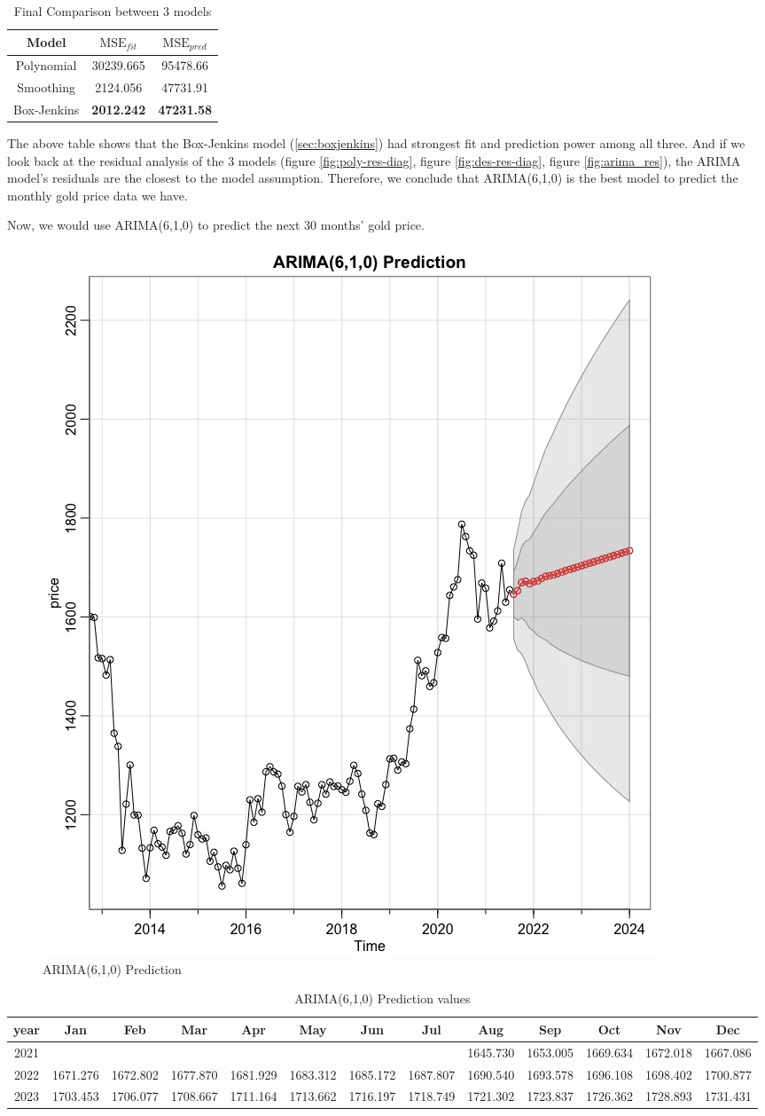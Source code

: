 \documentclass[paper=letter, fontsize=11pt]{scrartcl}
\begin{document}
\begin{table}[H]
    \centering
    \begin{tabular}{|c|c|c|}
    \hline
     Model &  $\mathrm{MSE}_{fit}$ & $\mathrm{MSE}_{pred}$ \\
     \hline\hline
     Polynomial & 30239.665 &  95478.66 \\
    Smoothing &  2124.056&  47731.91 \\
    Box-Jenkins &  \textbf{2012.242}  & \textbf{47231.58} \\
    \hline
    \end{tabular}
    \caption{Final Comparison between 3 models}
\end{table}

The above table shows that the Box-Jenkins model (\ref{sec:boxjenkins}) had strongest fit and prediction power among all three. And if we look back at the residual analysis of the 3 models (figure \ref{fig:poly-res-diag}, figure \ref{fig:des-res-diag}, figure \ref{fig:arima_res}), the ARIMA model's residuals are the closest to the model assumption. Therefore, we conclude that ARIMA(6,1,0) is the best model to predict the monthly gold price data we have.

Now, we would use ARIMA(6,1,0) to predict the next 30 months' gold price.

\begin{figure}[H]
    \centering
    \includegraphics[width=0.5\linewidth]{Image/arima-pred.jpeg}
    \caption{ARIMA(6,1,0) Prediction}
    \label{fig:arima-pred}
\end{figure}
\begin{table}[H]
    \centering
    {\scriptsize
    \begin{tabular}{|c|c|c|c|c|c|c|c|c|c|c|c|c|}
    \hline
year & Jan & Feb & Mar & Apr & May & Jun & Jul & Aug & Sep & Oct & Nov & Dec \\
\hline\hline
2021 & & & & & & & & 1645.730 & 1653.005 & 1669.634 & 1672.018 & 1667.086 \\
\hline
2022 & 1671.276 & 1672.802 & 1677.870 & 1681.929 & 1683.312 & 1685.172 & 1687.807 & 1690.540 & 1693.578 & 1696.108 & 1698.402 & 1700.877 \\
\hline
2023 & 1703.453 & 1706.077 & 1708.667 & 1711.164 & 1713.662 & 1716.197 & 1718.749 & 1721.302 & 1723.837 & 1726.362 & 1728.893 & 1731.431 \\
\hline
    \end{tabular}
    }
    \caption{ARIMA(6,1,0) Prediction values}
\end{table}
\end{document}
